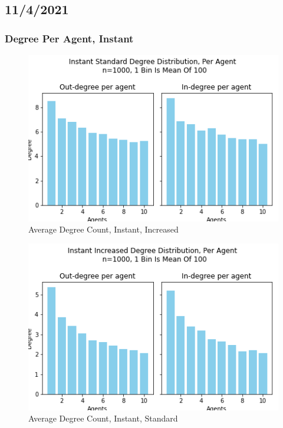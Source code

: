 \documentclass{article}
\begin{document}
\subsection{11/4/2021}
\subsubsection{Degree Per Agent, Instant}
\begin{center}
    \begin{figure}[!htbp]
        \centering
        \includegraphics[width=.8\textwidth]{ThesisKI/Images/IncreasedPerAgentInstant.png}
        \caption{Average Degree Count, Instant, Increased}
        \label{DPA:InsInc}
    \end{figure}
\end{center}
\begin{center}
    \begin{figure}[!htbp]
        \centering
        \includegraphics[width=.8\textwidth]{ThesisKI/Images/StandardPerAgentInstant.png}
        \caption{Average Degree Count, Instant, Standard}
        \label{DPA:InsStd}
    \end{figure}
\end{center}
\newpage
\end{document}
